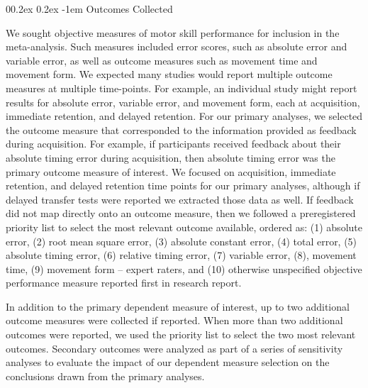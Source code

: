 \documentclass[
  english,
  man, donotrepeattitle,floatsintext]{apa7}
\makeatletter
\let\oldparagraph\paragraph
\renewcommand{\paragraph}[1]{\oldparagraph{#1}\mbox{}}
\renewcommand{\paragraph}{\@startsection{paragraph}{4}{\parindent}%
  {0\baselineskip \@plus 0.2ex \@minus 0.2ex}%
  {-1em}%
  {\normalfont\normalsize\bfseries\itshape\typesectitle}}
\makeatother
\begin{document}
\hypertarget{outcomes-collected}{%
\paragraph{Outcomes Collected}\label{outcomes-collected}}

We sought objective measures of motor skill performance for inclusion in the meta-analysis. Such measures included error scores, such as absolute error and variable error, as well as outcome measures such as movement time and movement form. We expected many studies would report multiple outcome measures at multiple time-points. For example, an individual study might report results for absolute error, variable error, and movement form, each at acquisition, immediate retention, and delayed retention. For our primary analyses, we selected the outcome measure that corresponded to the information provided as feedback during acquisition. For example, if participants received feedback about their absolute timing error during acquisition, then absolute timing error was the primary outcome measure of interest. We focused on acquisition, immediate retention, and delayed retention time points for our primary analyses, although if delayed transfer tests were reported we extracted those data as well. If feedback did not map directly onto an outcome measure, then we followed a preregistered priority list to select the most relevant outcome available, ordered as: (1) absolute error, (2) root mean square error, (3) absolute constant error, (4) total error, (5) absolute timing error, (6) relative timing error, (7) variable error, (8), movement time, (9) movement form -- expert raters, and (10) otherwise unspecified objective performance measure reported first in research report.

In addition to the primary dependent measure of interest, up to two additional outcome measures were collected if reported. When more than two additional outcomes were reported, we used the priority list to select the two most relevant outcomes. Secondary outcomes were analyzed as part of a series of sensitivity analyses to evaluate the impact of our dependent measure selection on the conclusions drawn from the primary analyses.
\end{document}
